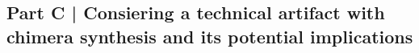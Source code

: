 \documentclass[9pt]{extarticle}
\begin{document}
\begin{enumerate}[label = \alph*)]
\section{Part C | Consiering a technical artifact with chimera synthesis and its potential implications} 

\end{enumerate}
\end{document}
